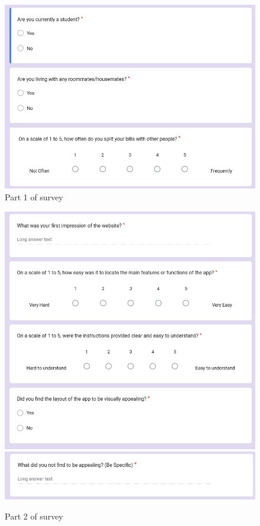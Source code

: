 \documentclass[12pt, titlepage]{article}
\begin{document}
\begin{figure}[H]
    \centering
    \includegraphics[width=1\linewidth]{survey_part_1.png}
    \caption{Part 1 of survey}
    \label{fig:pt1}
\end{figure}

\begin{figure}[H]
    \centering
    \includegraphics[width=1\linewidth]{survey_part_2.png}
    \includegraphics[width=1\linewidth]{survey_part_2_5.png}
    \caption{Part 2 of survey}
    \label{fig:pt2}
\end{figure}
\end{document}
